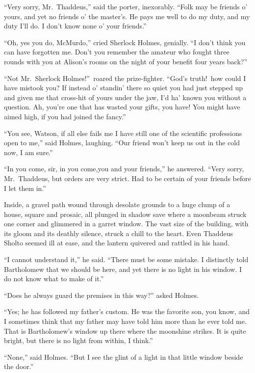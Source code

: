 \documentclass[12pt,english,oneside]{book}
\begin{document}
{}``Very sorry, Mr.\ Thaddeus,'' said the porter, inexorably. {}``Folk
may be friends o' yours, and yet no friends o' the master's. He pays
me well to do my duty, and my duty I'll do. I don't know none o' your
friends.''

{}``Oh, yes you do, McMurdo,'' cried Sherlock Holmes, genially.
{}``I don't think you can have forgotten me. Don't you remember the
amateur who fought three rounds with you at Alison's rooms on the
night of your benefit four years back?''

{}``Not Mr.\ Sherlock Holmes!''\ roared the prize-fighter. {}``God's
truth!\ how could I have mistook you? If instead o' standin' there
so quiet you had just stepped up and given me that cross-hit of yours
under the jaw, I'd ha' known you without a question. Ah, you're one
that has wasted your gifts, you have! You might have aimed high, if
you had joined the fancy.''

{}``You see, Watson, if all else fails me I have still one of the
scientific professions open to me,'' said Holmes, laughing. {}``Our
friend won't keep us out in the cold now, I am sure.''

{}``In you come, sir, in you come,\mdsh{---}you and your friends,''
he answered. {}``Very sorry, Mr.\ Thaddeus, but orders are very
strict. Had to be certain of your friends before I let them in.''

Inside, a gravel path wound through desolate grounds to a huge clump
of a house, square and prosaic, all plunged in shadow save where a
moonbeam struck one corner and glimmered in a garret window. The vast
size of the building, with its gloom and its deathly silence, struck
a chill to the heart. Even Thaddeus Sholto seemed ill at ease, and
the lantern quivered and rattled in his hand.

{}``I cannot understand it,'' he said. {}``There must be some mistake.
I distinctly told Bartholomew that we should be here, and yet there
is no light in his window. I do not know what to make of it.''

{}``Does he always guard the premises in this way?'' asked Holmes.

{}``Yes; he has followed my father's custom. He was the favorite
son, you know, and I sometimes think that my father may have told
him more than he ever told me. That is Bartholomew's window up there
where the moonshine strikes. It is quite bright, but there is no light
from within, I think.''

{}``None,'' said Holmes. {}``But I see the glint of a light in
that little window beside the door.''
\end{document}
